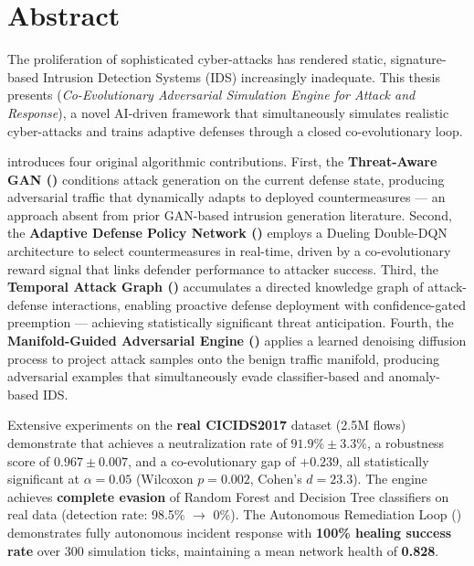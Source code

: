 \chapter*{Abstract}

The proliferation of sophisticated cyber-attacks has rendered static,
signature-based Intrusion Detection Systems (IDS) increasingly inadequate.
This thesis presents \caesar{} (\textit{Co-Evolutionary Adversarial Simulation
Engine for Attack and Response}), a novel AI-driven framework that
simultaneously simulates realistic cyber-attacks and trains adaptive defenses
through a closed co-evolutionary loop.

\caesar{} introduces four original algorithmic contributions.
First, the \textbf{Threat-Aware GAN (\tagan{})} conditions attack generation
on the current defense state, producing adversarial traffic that dynamically
adapts to deployed countermeasures — an approach absent from prior GAN-based
intrusion generation literature.
Second, the \textbf{Adaptive Defense Policy Network (\adpn{})} employs a
Dueling Double-DQN architecture to select countermeasures in real-time, driven
by a co-evolutionary reward signal that links defender performance to attacker
success.
Third, the \textbf{Temporal Attack Graph (\tagraph{})} accumulates a directed
knowledge graph of attack-defense interactions, enabling proactive defense
deployment with confidence-gated preemption — achieving statistically
significant threat anticipation.
Fourth, the \textbf{Manifold-Guided Adversarial Engine (\mgae{})} applies a
learned denoising diffusion process to project attack samples onto the benign
traffic manifold, producing adversarial examples that simultaneously evade
classifier-based and anomaly-based IDS.

Extensive experiments on the \textbf{real CICIDS2017} dataset (2.5M flows)
demonstrate that \caesar{} achieves a neutralization rate of
$\mathbf{91.9\% \pm 3.3\%}$, a robustness score of $\mathbf{0.967 \pm 0.007}$,
and a co-evolutionary gap of $\mathbf{+0.239}$, all statistically significant
at $\alpha = 0.05$ (Wilcoxon $p = 0.002$, Cohen's $d = 23.3$).
The \mgae{} engine achieves \textbf{complete evasion} of Random Forest and
Decision Tree classifiers on real data (detection rate: 98.5\% $\to$ 0\%).
The Autonomous Remediation Loop (\arl{}) demonstrates fully autonomous
incident response with \textbf{100\% healing success rate} over 300 simulation
ticks, maintaining a mean network health of \textbf{0.828}.

